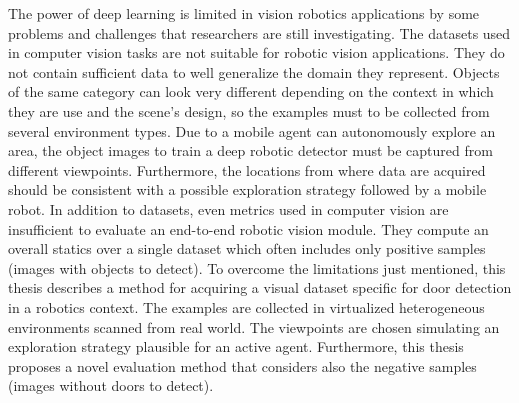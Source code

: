 The power of deep learning is limited in vision robotics applications by some problems and challenges that researchers are still investigating. The datasets used in computer vision tasks are not suitable for robotic vision applications. They do not contain sufficient data to well generalize the domain they represent. Objects of the same category can look very different depending on the context in which they are use and the scene's design, so the examples must to be collected from several environment types. Due to a mobile agent can autonomously explore an area, the object images to train a deep robotic detector must be captured from different viewpoints. Furthermore, the locations from where data are acquired should be consistent with a possible exploration strategy followed by a mobile robot. In addition to datasets, even metrics used in computer vision are insufficient to evaluate an end-to-end robotic vision module. They compute an overall statics over a single dataset which often includes only positive samples (images with objects to detect). To overcome the limitations just mentioned, this thesis describes a method for acquiring a visual dataset specific for door detection in a robotics context. The examples are collected in virtualized heterogeneous environments scanned from real world. The viewpoints are chosen simulating an exploration strategy plausible for an active agent. Furthermore, this thesis proposes a novel evaluation method that considers also the negative samples (images without doors to detect).